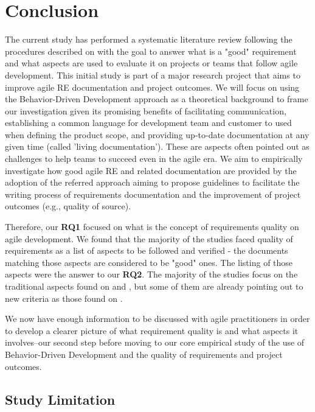 \section{Conclusion}

The current study has performed a systematic literature review following the procedures described on \cite{Kitchenham_2007} with the goal to answer what is a "good" requirement and what aspects are used to evaluate it on projects or teams that follow agile development. This initial study is part of a major research project that aims to improve agile RE documentation and project outcomes. We will focus on using the Behavior-Driven Development approach \cite{Smart2014} as a theoretical background to frame our investigation given its promising benefits of facilitating communication, establishing a common language for development team and customer to used when defining the product scope, and providing up-to-date documentation at any given time (called 'living documentation'). These are aspects often pointed out as challenges to help teams to succeed even in the agile era. We aim to empirically investigate how good agile RE and related documentation are provided by the adoption of the referred approach aiming to propose guidelines to facilitate the writing process of requirements documentation and the improvement of project outcomes (e.g., quality of source). %

Therefore, our \textbf{RQ1} focused on what is the concept of requirements quality on agile development. We found that the majority of the studies faced quality of requirements as a list of aspects to be followed and verified - the documents matching those aspects are considered to be "good" ones. The listing of those aspects were the answer to our \textbf{RQ2}. The majority of the studies focus on the traditional aspects found on \cite{Babok_2009} and \cite{Babok_2015}, but some of them are already pointing out to new criteria as those found on \cite{SMART_INVEST_2013}.

We now have enough information to be discussed with agile practitioners in order to develop a clearer picture of what requirement quality is and what aspects it involves--our second step before moving to our core empirical study of the use of Behavior-Driven Development and the quality of requirements and project outcomes.

\subsection{Study Limitation}


